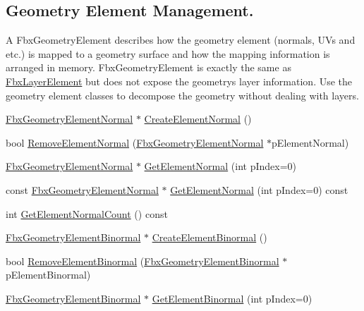 \subsection*{Geometry Element Management.}
\label{_amgrp5c89d833850d940ed0bcf07e321db4e1}%
 A Fbx\+Geometry\+Element describes how the geometry element (normals, U\+Vs and etc.) is mapped to a geometry surface and how the mapping information is arranged in memory. Fbx\+Geometry\+Element is exactly the same as \hyperlink{class_fbx_layer_element}{Fbx\+Layer\+Element} but does not expose the geometry\textquotesingle{}s layer information. Use the geometry element classes to decompose the geometry without dealing with layers. \begin{DoxyCompactItemize}
\item 
\hyperlink{fbxlayer_8h_a54a5aaec6f1979871fe9d93dd2d246c9}{Fbx\+Geometry\+Element\+Normal} $\ast$ \hyperlink{class_fbx_geometry_base_a13810d0c6ac68ab14be3f1316b977f7d}{Create\+Element\+Normal} ()
\item 
bool \hyperlink{class_fbx_geometry_base_a9aadbaa3f50db80b67bd1b3bc9119c7b}{Remove\+Element\+Normal} (\hyperlink{fbxlayer_8h_a54a5aaec6f1979871fe9d93dd2d246c9}{Fbx\+Geometry\+Element\+Normal} $\ast$p\+Element\+Normal)
\item 
\hyperlink{fbxlayer_8h_a54a5aaec6f1979871fe9d93dd2d246c9}{Fbx\+Geometry\+Element\+Normal} $\ast$ \hyperlink{class_fbx_geometry_base_ab7486b08caa6e90923fbb194bd81a61e}{Get\+Element\+Normal} (int p\+Index=0)
\item 
const \hyperlink{fbxlayer_8h_a54a5aaec6f1979871fe9d93dd2d246c9}{Fbx\+Geometry\+Element\+Normal} $\ast$ \hyperlink{class_fbx_geometry_base_a33d41a1c8b2346aa73a2576225387fb4}{Get\+Element\+Normal} (int p\+Index=0) const
\item 
int \hyperlink{class_fbx_geometry_base_ae8cffdf94daa997de808328579c636c2}{Get\+Element\+Normal\+Count} () const
\item 
\hyperlink{fbxlayer_8h_a066e30a64eb051458583b656a651e90b}{Fbx\+Geometry\+Element\+Binormal} $\ast$ \hyperlink{class_fbx_geometry_base_aaac14a98782b9f68803462f033297d05}{Create\+Element\+Binormal} ()
\item 
bool \hyperlink{class_fbx_geometry_base_a07a88ca035b8b21b407a88bef375831f}{Remove\+Element\+Binormal} (\hyperlink{fbxlayer_8h_a066e30a64eb051458583b656a651e90b}{Fbx\+Geometry\+Element\+Binormal} $\ast$p\+Element\+Binormal)
\item 
\hyperlink{fbxlayer_8h_a066e30a64eb051458583b656a651e90b}{Fbx\+Geometry\+Element\+Binormal} $\ast$ \hyperlink{class_fbx_geometry_base_a810b4a313e01bbaa41fe25ac753a8996}{Get\+Element\+Binormal} (int p\+Index=0)

\end{DoxyCompactItemize}
